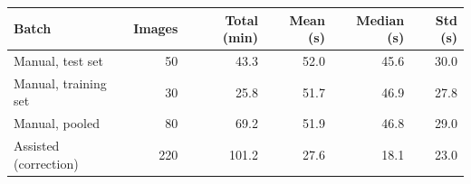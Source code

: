 \begin{tabular}{@{}lrrrrr@{}}
\toprule
Batch & Images & Total (min) & Mean (s) & Median (s) & Std (s) \\
\midrule
Manual, test set & 50 & 43.3 & 52.0 & 45.6 & 30.0 \\
Manual, training set & 30 & 25.8 & 51.7 & 46.9 & 27.8 \\
Manual, pooled & 80 & 69.2 & 51.9 & 46.8 & 29.0 \\
\midrule
Assisted (correction) & 220 & 101.2 & 27.6 & 18.1 & 23.0 \\
\bottomrule
\end{tabular}
